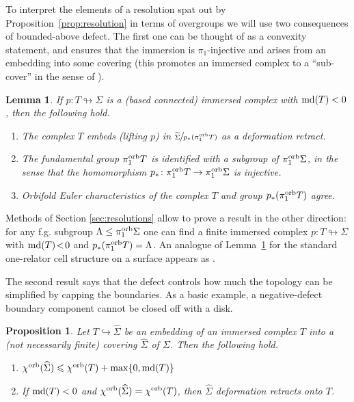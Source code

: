 \documentclass{amsart}
\newtheorem{lemma}[conjecture]{Lemma}
\newtheorem{proposition}[conjecture]{Proposition}
\newcommand{\cho}{\chi^{\textnormal{orb}}}
\newcommand{\md}{\textnormal{md}}
\newcommand{\pio}{\pi_1^{\textnormal{orb}}}
\newcommand{\whS}{{\widehat{\Sigma}}}
\begin{document}
To interpret the elements of a resolution spat out by Proposition~\ref{prop:resolution} in terms of overgroups we will use two consequences of bounded-above defect. The first one can be thought of as a convexity statement, and ensures that the immersion is $\pi_1$-injective and arises from an embedding into some covering (this promotes an immersed complex to a ``sub-cover'' in the sense of \cite[Definition 2.1]{local_stats_random_perms_free_prods_PuderZimhoni24}).
\begin{lemma}\label{lmm:no_dft_subgp}
If $p\colon\!T\!\looparrowright\!\Sigma$ is a (based connected) immersed complex with $\md(T)<0$, then the following hold.
\begin{enumerate}
\item The complex $T$ embeds (lifting $p$) in $\sfrac{\widetilde\Sigma}{p_*(\pio T)}$ as a deformation retract.
\item The fundamental group $\pio T$ is identified with a subgroup of $\pio\Sigma$, in the sense that the homomorphism $p_*\colon\pio T\to\pio\Sigma$ is injective.
\item Orbifold Euler characteristics of the complex $T$ and group $p_*(\pio T)$ agree.
\end{enumerate}
\end{lemma}
Methods of Section \ref{sec:resolutions} allow to prove a result in the other direction: for any f.g. subgroup $\Lambda\le\pio\Sigma$ one can find a finite immersed complex $p\colon T\looparrowright\Sigma$ with $\md(T)\!<\!0$ and $p_*(\pio T)=\Lambda$. An analogue of Lemma~\ref{lmm:no_dft_subgp} for the standard one-relator cell structure on a surface appears as \cite[Prop 4.3 and Corollary 4.11]{core_surfaces_MageePuder22}.

The second result says that the defect controls how much the topology can be simplified by capping the boundaries. As a basic example, a negative-defect boundary component cannot be closed off with a disk.
\begin{proposition}\label{prop:no_cap}
Let $T\hookrightarrow\whS$ be an embedding of an immersed complex $T$ into a (not necessarily finite) covering $\whS$ of $\Sigma$. Then the following hold.
\begin{enumerate}
\item\label{itm:nocap_general} $\cho(\whS)\leqslant\cho(T)+\max\{0,\md(T)\}$
\item\label{itm:nocap_nodft} If $\md(T)<0$ and $\cho(\whS)=\cho(T)$, then $\whS$ deformation retracts onto $T$.
\end{enumerate}
\end{proposition}
\end{document}
